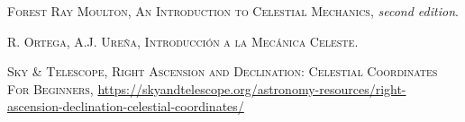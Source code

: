 \documentclass[11pt]{article}
\begin{document}
\newpage

\begin{thebibliography}{99}
 \textsc{Forest Ray Moulton}, \textsc{An Introduction to Celestial Mechanics}, \textit{second edition}.

 \textsc{R. Ortega, A.J. Ureña}, \textsc{Introducción a la Mecánica Celeste}.

 \textsc{Sky \& Telescope}, \textsc{Right Ascension and Declination: Celestial Coordinates For Beginners}, \url{https://skyandtelescope.org/astronomy-resources/right-ascension-declination-celestial-coordinates/}

\end{thebibliography}
\end{document}
